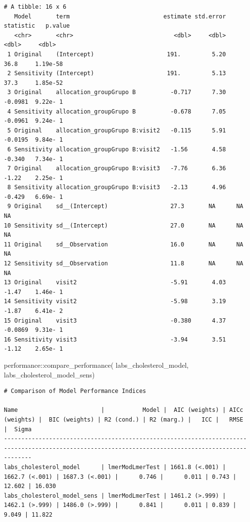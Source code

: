 \documentclass[
  12pt,
]{article}
\newenvironment{Shaded}{\begin{snugshade}}{\end{snugshade}}
\newcommand{\FunctionTok}[1]{\textcolor[rgb]{0.28,0.35,0.67}{#1}}
\newcommand{\NormalTok}[1]{\textcolor[rgb]{0.00,0.23,0.31}{#1}}
\newcommand{\SpecialCharTok}[1]{\textcolor[rgb]{0.37,0.37,0.37}{#1}}
\begin{document}
\begin{verbatim}
# A tibble: 16 x 6
   Model       term                           estimate std.error statistic   p.value
   <chr>       <chr>                             <dbl>     <dbl>     <dbl>     <dbl>
 1 Original    (Intercept)                     191.         5.20   36.8     1.19e-58
 2 Sensitivity (Intercept)                     191.         5.13   37.3     1.85e-52
 3 Original    allocation_groupGrupo B          -0.717      7.30   -0.0981  9.22e- 1
 4 Sensitivity allocation_groupGrupo B          -0.678      7.05   -0.0961  9.24e- 1
 5 Original    allocation_groupGrupo B:visit2   -0.115      5.91   -0.0195  9.84e- 1
 6 Sensitivity allocation_groupGrupo B:visit2   -1.56       4.58   -0.340   7.34e- 1
 7 Original    allocation_groupGrupo B:visit3   -7.76       6.36   -1.22    2.25e- 1
 8 Sensitivity allocation_groupGrupo B:visit3   -2.13       4.96   -0.429   6.69e- 1
 9 Original    sd__(Intercept)                  27.3       NA      NA      NA       
10 Sensitivity sd__(Intercept)                  27.0       NA      NA      NA       
11 Original    sd__Observation                  16.0       NA      NA      NA       
12 Sensitivity sd__Observation                  11.8       NA      NA      NA       
13 Original    visit2                           -5.91       4.03   -1.47    1.46e- 1
14 Sensitivity visit2                           -5.98       3.19   -1.87    6.41e- 2
15 Original    visit3                           -0.380      4.37   -0.0869  9.31e- 1
16 Sensitivity visit3                           -3.94       3.51   -1.12    2.65e- 1
\end{verbatim}

\begin{Shaded}
\begin{Highlighting}[]
\NormalTok{performance}\SpecialCharTok{::}\FunctionTok{compare\_performance}\NormalTok{(}
\NormalTok{    labs\_cholesterol\_model, }
\NormalTok{    labs\_cholesterol\_model\_sens) }
\end{Highlighting}
\end{Shaded}

\begin{verbatim}
# Comparison of Model Performance Indices

Name                        |           Model |  AIC (weights) | AICc (weights) |  BIC (weights) | R2 (cond.) | R2 (marg.) |   ICC |   RMSE |  Sigma
----------------------------------------------------------------------------------------------------------------------------------------------------
labs_cholesterol_model      | lmerModLmerTest | 1661.8 (<.001) | 1662.7 (<.001) | 1687.3 (<.001) |      0.746 |      0.011 | 0.743 | 12.602 | 16.030
labs_cholesterol_model_sens | lmerModLmerTest | 1461.2 (>.999) | 1462.1 (>.999) | 1486.0 (>.999) |      0.841 |      0.011 | 0.839 |  9.049 | 11.822
\end{verbatim}
\end{document}
